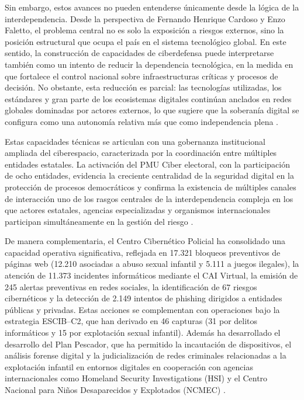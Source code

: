 Sin embargo, estos avances no pueden entenderse únicamente desde la lógica de la interdependencia. Desde la perspectiva de Fernando Henrique Cardoso y Enzo Faletto, el problema central no es solo la exposición a riesgos externos, sino la posición estructural que ocupa el país en el sistema tecnológico global. En este sentido, la construcción de capacidades de ciberdefensa puede interpretarse también como un intento de reducir la dependencia tecnológica, en la medida en que fortalece el control nacional sobre infraestructuras críticas y procesos de decisión. No obstante, esta reducción es parcial: las tecnologías utilizadas, los estándares y gran parte de los ecosistemas digitales continúan anclados en redes globales dominadas por actores externos, lo que sugiere que la soberanía digital se configura como una autonomía relativa más que como independencia plena \parencite{cardoso_faletto_dependencia_1977}.

Estas capacidades técnicas se articulan con una gobernanza institucional ampliada del ciberespacio, caracterizada por la coordinación entre múltiples entidades estatales. La activación del PMU Ciber electoral, con la participación de ocho entidades, evidencia la creciente centralidad de la seguridad digital en la protección de procesos democráticos y confirma la existencia de múltiples canales de interacción uno de los rasgos centrales de la interdependencia compleja en los que actores estatales, agencias especializadas y organismos internacionales participan simultáneamente en la gestión del riesgo \parencite{mindefensa_audiencia_rendicion_2025,mintic_seguridad_digital_2025}.

De manera complementaria, el Centro Cibernético Policial ha consolidado una capacidad operativa significativa, reflejada en 17.321 bloqueos preventivos de páginas web (12.210 asociadas a abuso sexual infantil y 5.111 a juegos ilegales), la atención de 11.373 incidentes informáticos mediante el CAI Virtual, la emisión de 245 alertas preventivas en redes sociales, la identificación de 67 riesgos cibernéticos y la detección de 2.149 intentos de phishing dirigidos a entidades públicas y privadas. Estas acciones se complementan con operaciones bajo la estrategia ESCIB--C2, que han derivado en 46 capturas (31 por delitos informáticos y 15 por explotación sexual infantil). Además ha desarrollado el desarrollo del Plan Pescador, que ha permitido la incautación de dispositivos, el análisis forense digital y la judicialización de redes criminales relacionadas a la explotación infantil en entornos digitales en cooperación con agencias internacionales como Homeland Security Investigations (HSI) y el Centro Nacional para Niños Desaparecidos y Explotados (NCMEC) \parencite{policia_rendicion_logros_retos_2025,policia_plan_pescador_ninez_digital}.

